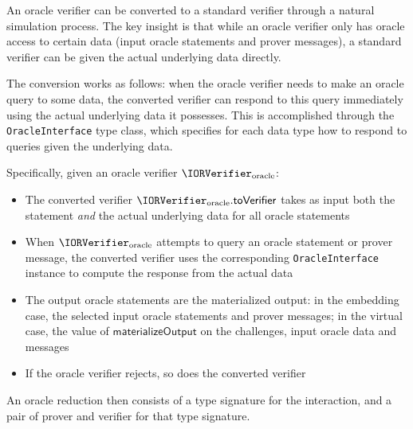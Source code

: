 \begin{definition}
    \label{def:oracle_verifier_to_verifier}
    An oracle verifier can be converted to a standard verifier through a natural simulation process. The key insight is that while an oracle verifier only has oracle access to certain data (input oracle statements and prover messages), a standard verifier can be given the actual underlying data directly.

    The conversion works as follows: when the oracle verifier needs to make an oracle query to some data, the converted verifier can respond to this query immediately using the actual underlying data it possesses. This is accomplished through the \texttt{OracleInterface} type class, which specifies for each data type how to respond to queries given the underlying data.

    Specifically, given an oracle verifier \(\IORVerifier_{\text{oracle}}\):
    \begin{itemize}
        \item The converted verifier \(\IORVerifier_{\text{oracle}}.\mathsf{toVerifier}\) takes as input both the statement \emph{and} the actual underlying data for all oracle statements
        \item When \(\IORVerifier_{\text{oracle}}\) attempts to query an oracle statement or prover message, the converted verifier uses the corresponding \texttt{OracleInterface} instance to compute the response from the actual data
        \item The output oracle statements are the materialized output: in the embedding case, the selected input oracle statements and prover messages; in the virtual case, the value of \(\mathsf{materializeOutput}\) on the challenges, input oracle data and messages
        \item If the oracle verifier rejects, so does the converted verifier
    \end{itemize}
    \leanok
\end{definition}

An oracle reduction then consists of a type signature for the interaction, and a pair of prover and
verifier for that type signature.

